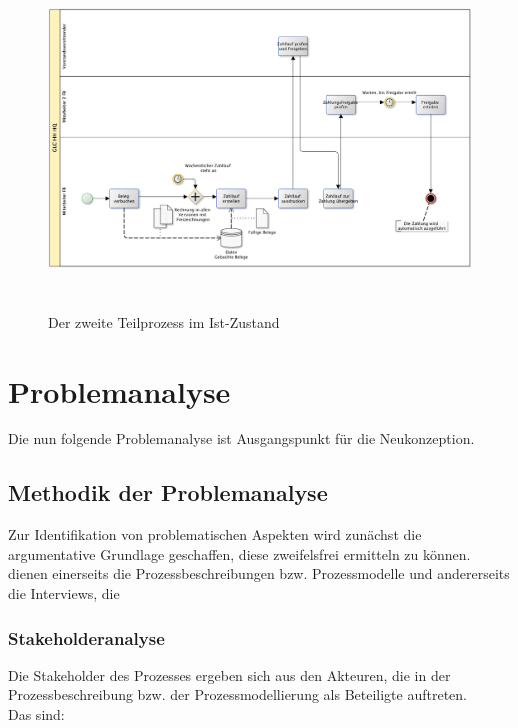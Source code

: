 \begin{figure}[!htb]
\centering
\includegraphics[height=90mm]{images/prozess_ist_buchung}
\caption{Der zweite Teilprozess im Ist-Zustand}
\label{Teilprozess 2 im Ist-Zustand, BPMN}
\end{figure}
\newpage


\section{Problemanalyse}
Die nun folgende Problemanalyse ist Ausgangspunkt für die Neukonzeption.

\subsection{Methodik der Problemanalyse}
Zur Identifikation von problematischen Aspekten wird zunächst die argumentative Grundlage geschaffen, diese zweifelsfrei ermitteln zu können.
 dienen einerseits die Prozessbeschreibungen bzw. Prozessmodelle und andererseits die Interviews, die 
\subsubsection{Stakeholderanalyse}
Die Stakeholder des Prozesses ergeben sich aus den Akteuren, die in der Prozessbeschreibung bzw. der Prozessmodellierung als Beteiligte auftreten.\\
Das sind:


